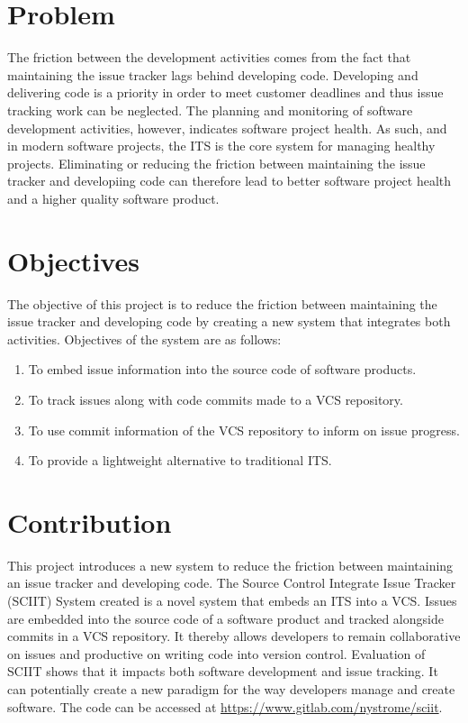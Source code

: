 \documentclass{mproj}
\begin{document}
\section{Problem}

The friction between the development activities comes from the fact that maintaining the issue tracker lags behind developing code. Developing and delivering code is a priority in order to meet customer deadlines and thus issue tracking work can be neglected. The planning and monitoring of software development activities, however, indicates software project health. As such, and in modern software projects, the ITS is the core system for managing healthy projects. Eliminating or reducing the friction between maintaining the issue tracker and developiing code can therefore lead to better software project health and a higher quality software product.



\section{Objectives}

The objective of this project is to reduce the friction between maintaining the issue tracker and developing code by creating a new system that integrates both activities. Objectives of the system are as follows:

\begin{enumerate}
  \item To embed issue information into the source code of software products.
  \item To track issues along with code commits made to a VCS repository.
  \item To use commit information of the VCS repository to inform on issue progress.
  \item To provide a lightweight alternative to traditional ITS.
\end{enumerate}


\section{Contribution}

This project introduces a new system to reduce the friction between maintaining an issue tracker and developing code. The Source Control Integrate Issue Tracker (SCIIT) System created is a novel system that embeds an ITS into a VCS. Issues are embedded into the source code of a software product and tracked alongside commits in a VCS repository. It thereby allows developers to remain collaborative on issues and productive on writing code into version control. Evaluation of SCIIT shows that it impacts both software development and issue tracking. It can potentially create a new paradigm for the way developers manage and create software. The code can be accessed at \href{https://www.gitlab.com/nystrome/sciit}{https://www.gitlab.com/nystrome/sciit}.
\end{document}
